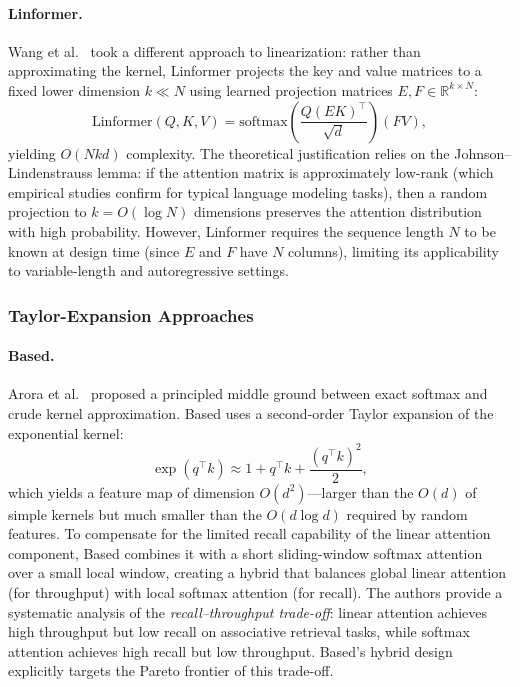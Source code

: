 \paragraph{Linformer.}
Wang et al.~\cite{wang2020linformer} took a different approach to linearization: rather than approximating the kernel, Linformer projects the key and value matrices to a fixed lower dimension $k \ll N$ using learned projection matrices $E, F \in \mathbb{R}^{k \times N}$:
\begin{equation}
\text{Linformer}(Q, K, V) = \text{softmax}\!\left(\frac{Q (EK)^\top}{\sqrt{d}}\right) (FV),
\label{eq:linformer}
\end{equation}
yielding $O(Nkd)$ complexity. The theoretical justification relies on the Johnson--Lindenstrauss lemma: if the attention matrix is approximately low-rank (which empirical studies confirm for typical language modeling tasks), then a random projection to $k = O(\log N)$ dimensions preserves the attention distribution with high probability. However, Linformer requires the sequence length $N$ to be known at design time (since $E$ and $F$ have $N$ columns), limiting its applicability to variable-length and autoregressive settings.

\subsubsection{Taylor-Expansion Approaches}
\label{subsubsec:taylor-linear}

\paragraph{Based.}
Arora et al.~\cite{eyuboglu2024based} proposed a principled middle ground between exact softmax and crude kernel approximation. Based uses a second-order Taylor expansion of the exponential kernel:
\begin{equation}
\exp(q^\top k) \approx 1 + q^\top k + \frac{(q^\top k)^2}{2},
\label{eq:based-taylor}
\end{equation}
which yields a feature map of dimension $O(d^2)$---larger than the $O(d)$ of simple kernels but much smaller than the $O(d \log d)$ required by random features. To compensate for the limited recall capability of the linear attention component, Based combines it with a short sliding-window softmax attention over a small local window, creating a hybrid that balances global linear attention (for throughput) with local softmax attention (for recall). The authors provide a systematic analysis of the \emph{recall--throughput trade-off}: linear attention achieves high throughput but low recall on associative retrieval tasks, while softmax attention achieves high recall but low throughput. Based's hybrid design explicitly targets the Pareto frontier of this trade-off.

